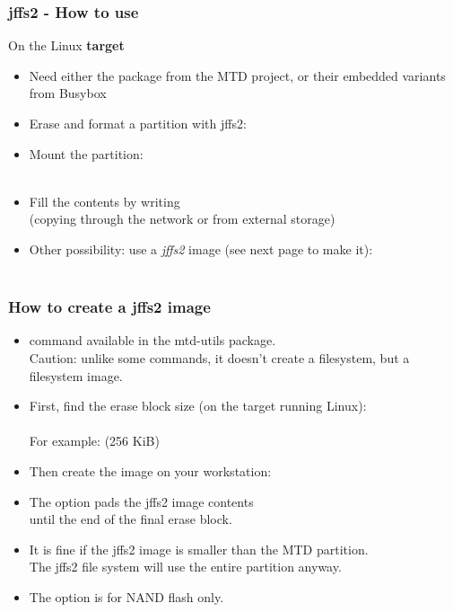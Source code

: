 \begin{frame}
  \frametitle{jffs2 - How to use}
  On the Linux {\bf target}
  \begin{itemize}
  \item Need either the  package from the MTD project,
    or their embedded variants from Busybox
  \item Erase and format a partition with jffs2:\\
  \item Mount the partition:\\
    \\
  \item Fill the contents by writing\\
    (copying through the network or from external storage)
  \item Other possibility: use a {\em jffs2} image (see next page to
    make it):\\
    \\
  \end{itemize}
\end{frame}

\begin{frame}
  \frametitle{How to create a jffs2 image}
  \begin{itemize}
  \item {} command available in the mtd-utils package.\\
    Caution: unlike some  commands, it doesn't create a
    filesystem, but a filesystem image.
  \item First, find the erase block size (on the target running Linux):\\
     \\
    For example:  (256 KiB)
  \item Then create the image on your workstation:\\
  \item The  option pads the jffs2 image contents\\
    until the end of the final erase block.
  \item It is fine if the jffs2 image is smaller than the MTD partition.\\
    The jffs2 file system will use the entire partition anyway.
  \item The  option is for NAND flash only.
  \end{itemize}
\end{frame}

